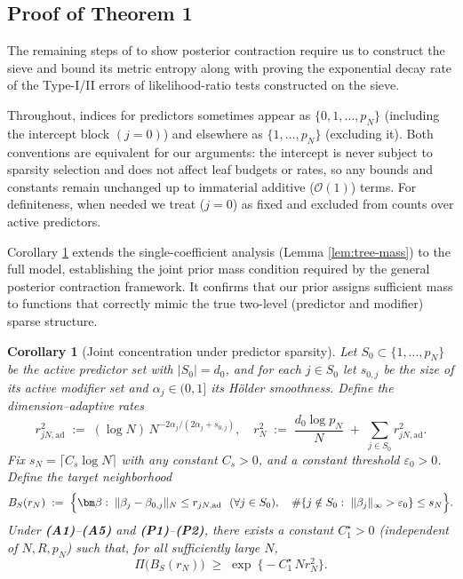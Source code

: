 \documentclass[11pt]{article}
\theoremstyle{plain}
\newtheorem{corollary}{Corollary}
\theoremstyle{definition}
\theoremstyle{plain}
\begin{document}
\subsection{Proof of Theorem 1}
\label{sec:proof_thm1}
The remaining steps of \citet{Ghosal2000} to show posterior contraction require us to construct the sieve and bound its metric entropy along with proving the exponential decay rate of the Type-I/II errors of likelihood-ratio tests constructed on the sieve. 

Throughout, indices for predictors sometimes appear as $\{0,1,\dots,p_N\}$ (including the intercept block $(j=0)$) and elsewhere as $\{1,\dots,p_N\}$ (excluding it). Both conventions are equivalent for our arguments: the intercept is never subject to sparsity selection and does not affect leaf budgets or rates, so any bounds and constants remain unchanged up to immaterial additive ($\mathcal{O}(1)$) terms. For definiteness, when needed we treat ($j=0$) as fixed and excluded from counts over active predictors.

Corollary \ref{cor:joint-smallball} extends the single-coefficient analysis (Lemma \ref{lem:tree-mass}) to the full model, establishing the joint prior mass condition required by the general posterior contraction framework. It confirms that our prior assigns sufficient mass to functions that correctly mimic the true two-level (predictor and modifier) sparse structure.

\begin{corollary}[Joint concentration under predictor sparsity]
\label{cor:joint-smallball}
Let $S_0\subset\{1,\dots,p_N\}$ be the active predictor set with $|S_0|=d_0$, and for each $j\in S_0$
let $s_{0,j}$ be the size of its active modifier set and $\alpha_j\in(0,1]$ its H\"older smoothness.
Define the dimension–adaptive rates
\[
r_{jN,\mathrm{ad}}^2 \;:=\; (\log N)\,N^{-2\alpha_j/(2\alpha_j+s_{0,j})},
\quad
r_N^2 \;:=\; \frac{d_0\log p_N}{N} \;+\; \sum_{j\in S_0} r_{jN,\mathrm{ad}}^2.
\]
Fix $s_N=\lceil C_s\log N\rceil$ with any constant $C_s>0$, and a constant threshold $\varepsilon_0>0$.
Define the target neighborhood
\[
 B_{S}(r_N) \;:=\;
 \Bigl\{
    \bm\beta:\;
    \|\beta_{j}-\beta_{0,j}\|_{N}\le r_{jN,\mathrm{ad}}\ \ (\forall j\in S_0),\quad
    \#\{j\notin S_0:\ \|\beta_j\|_\infty>\varepsilon_0\}\le s_N
 \Bigr\}.
\]
Under {\textbf{(A1)}}–{\textbf{(A5)}} and {\textbf{(P1)}}–{\textbf{(P2)}}, there exists a constant $C_1^\star>0$ (independent of $N,R,p_N$) such that, for all sufficiently large $N$,
\[
 \Pi\bigl(B_{S}(r_N)\bigr)\;\ge\;\exp \ \!\bigl\{-C_{1}^{\star}\,N r_N^{2}\bigr\}.
\]
\end{corollary}
\end{document}
